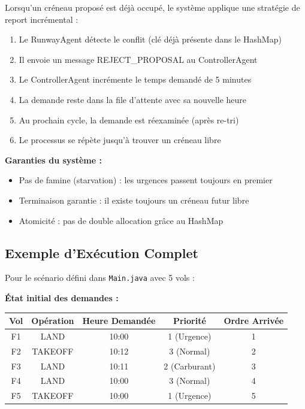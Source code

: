 \documentclass[12pt,a4paper]{article}
\begin{document}
\begin{tcolorbox}[colback=lightblue!15, colframe=primaryblue, title=\textbf{Processus de Résolution de Conflits}]
Lorsqu'un créneau proposé est déjà occupé, le système applique une stratégie de report incrémental :

\begin{enumerate}[leftmargin=*]
    \item Le RunwayAgent détecte le conflit (clé déjà présente dans le HashMap)
    \item Il envoie un message REJECT\_PROPOSAL au ControllerAgent
    \item Le ControllerAgent incrémente le temps demandé de 5 minutes
    \item La demande reste dans la file d'attente avec sa nouvelle heure
    \item Au prochain cycle, la demande est réexaminée (après re-tri)
    \item Le processus se répète jusqu'à trouver un créneau libre
\end{enumerate}

\textbf{Garanties du système :}
\begin{itemize}
    \item Pas de famine (starvation) : les urgences passent toujours en premier
    \item Terminaison garantie : il existe toujours un créneau futur libre
    \item Atomicité : pas de double allocation grâce au HashMap
\end{itemize}
\end{tcolorbox}

\subsection{Exemple d'Exécution Complet}

Pour le scénario défini dans \texttt{Main.java} avec 5 vols :

\textbf{État initial des demandes :}

\begin{center}
\begin{tabular}{|c|c|c|c|c|}
\hline
\rowcolor{lightblue!30}
\textbf{Vol} & \textbf{Opération} & \textbf{Heure Demandée} & \textbf{Priorité} & \textbf{Ordre Arrivée} \\
\hline
F1 & LAND & 10:00 & 1 (Urgence) & 1 \\
\hline
F2 & TAKEOFF & 10:12 & 3 (Normal) & 2 \\
\hline
F3 & LAND & 10:11 & 2 (Carburant) & 3 \\
\hline
F4 & LAND & 10:00 & 3 (Normal) & 4 \\
\hline
F5 & TAKEOFF & 10:00 & 1 (Urgence) & 5 \\
\hline
\end{tabular}
\end{center}
\end{document}
